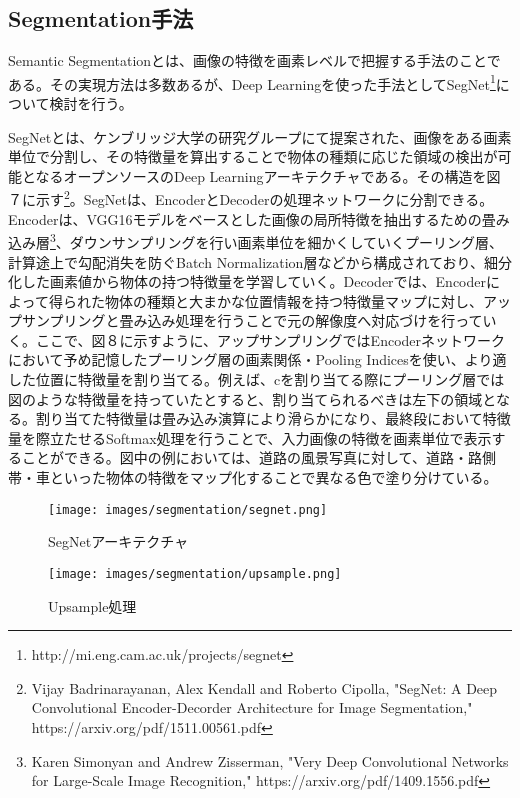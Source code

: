 \subsection{Segmentation手法}
Semantic Segmentationとは、画像の特徴を画素レベルで把握する手法のことである。その実現方法は多数あるが、Deep Learningを使った手法としてSegNet\footnote{http:\slash\slash mi.eng.cam.ac.uk\slash projects\slash segnet}について検討を行う。

SegNetとは、ケンブリッジ大学の研究グループにて提案された、画像をある画素単位で分割し、その特徴量を算出することで物体の種類に応じた領域の検出が可能となるオープンソースのDeep Learningアーキテクチャである。その構造を図７に示す\footnote{Vijay Badrinarayanan, Alex Kendall and Roberto Cipolla, "SegNet: A Deep Convolutional Encoder-Decorder Architecture for Image Segmentation," https:\slash\slash arxiv.org\slash pdf\slash 1511.00561.pdf}。SegNetは、EncoderとDecoderの処理ネットワークに分割できる。Encoderは、VGG16モデルをベースとした画像の局所特徴を抽出するための畳み込み層\footnote{Karen Simonyan and Andrew Zisserman, "Very Deep Convolutional Networks for Large-Scale Image Recognition," https:\slash\slash arxiv.org\slash pdf\slash 1409.1556.pdf}、ダウンサンプリングを行い画素単位を細かくしていくプーリング層、計算途上で勾配消失を防ぐBatch Normalization層などから構成されており、細分化した画素値から物体の持つ特徴量を学習していく。Decoderでは、Encoderによって得られた物体の種類と大まかな位置情報を持つ特徴量マップに対し、アップサンプリングと畳み込み処理を行うことで元の解像度へ対応づけを行っていく。ここで、図８に示すように、アップサンプリングではEncoderネットワークにおいて予め記憶したプーリング層の画素関係・Pooling Indicesを使い、より適した位置に特徴量を割り当てる。例えば、cを割り当てる際にプーリング層では図のような特徴量を持っていたとすると、割り当てられるべきは左下の領域となる。割り当てた特徴量は畳み込み演算により滑らかになり、最終段において特徴量を際立たせるSoftmax処理を行うことで、入力画像の特徴を画素単位で表示することができる。図中の例においては、道路の風景写真に対して、道路・路側帯・車といった物体の特徴をマップ化することで異なる色で塗り分けている。
\\
\begin{figure}[htbp]
  \begin{center}
    \texttt{[image: images/segmentation/segnet.png]}
    \caption{SegNetアーキテクチャ}
    \label{fig:segnet}
  \end{center}
\end{figure}
\begin{figure}[htbp]
  \begin{center}
    \texttt{[image: images/segmentation/upsample.png]}
    \caption{Upsample処理}
    \label{fig:upsample}
  \end{center}
\end{figure}

